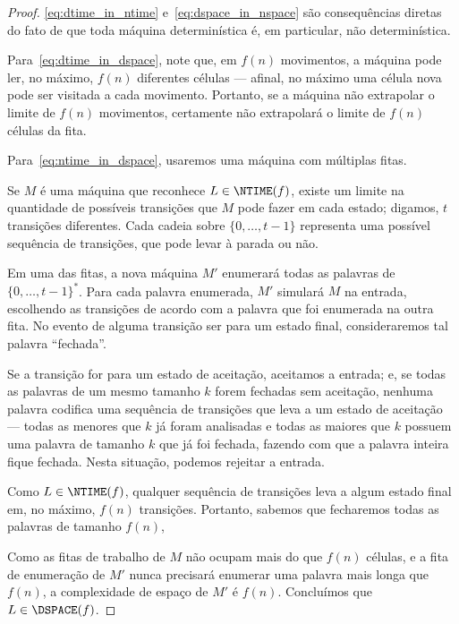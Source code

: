 \begin{proof}
    \ref{eq:dtime_in_ntime} e~\ref{eq:dspace_in_nspace} são consequências diretas
    do fato de que toda máquina determinística é,
    em particular, não determinística.

    Para~\ref{eq:dtime_in_dspace},
    note que, em $f(n)$ movimentos,
    a máquina pode ler, no máximo,
    $f(n)$ diferentes células
    --- afinal, no máximo uma célula nova pode ser visitada a cada movimento.
    Portanto,
    se a máquina não extrapolar o limite de $f(n)$ movimentos,
    certamente não extrapolará o limite de $f(n)$ células da fita.

    Para~\ref{eq:ntime_in_dspace},
    usaremos uma máquina com múltiplas fitas.

    Se $M$ é uma máquina que reconhece $L \in \NTIME(f)$,
    existe um limite na quantidade de possíveis transições
    que $M$ pode fazer em cada estado;
    digamos, $t$ transições diferentes.
    Cada cadeia sobre $\{0, \dots, t-1\}$ representa uma possível
    sequência de transições,
    que pode levar à parada ou não.

    Em uma das fitas,
    a nova máquina $M'$
    enumerará todas as palavras de ${\{0, \dots, t-1\}}^*$.
    Para cada palavra enumerada,
    $M'$ simulará $M$ na entrada,
    escolhendo as transições de acordo com a palavra
    que foi enumerada na outra fita.
    No evento de alguma transição ser para um estado final,
    consideraremos tal palavra ``fechada''.

    Se a transição for para um estado de aceitação,
    aceitamos a entrada;
    e, se todas as palavras de um mesmo tamanho $k$
    forem fechadas sem aceitação,
    nenhuma palavra
    codifica uma sequência de transições
    que leva a um estado de aceitação
    --- todas as menores que $k$ já foram analisadas
    e todas as maiores que $k$
    possuem uma palavra de tamanho $k$ que já foi fechada,
    fazendo com que a palavra inteira fique fechada.
    Nesta situação, podemos rejeitar a entrada.

    Como $L \in \NTIME(f)$,
    qualquer sequência de transições leva a algum estado final
    em, no máximo, $f(n)$ transições.
    Portanto,
    sabemos que fecharemos todas as palavras
    de tamanho $f(n)$,

    Como as fitas de trabalho de $M$
    não ocupam mais do que $f(n)$ células,
    e a fita de enumeração de $M'$
    nunca precisará enumerar uma palavra mais longa que $f(n)$,
    a complexidade de espaço de $M'$ é $f(n)$.
    Concluímos que $L \in \DSPACE(f)$.
\end{proof}

